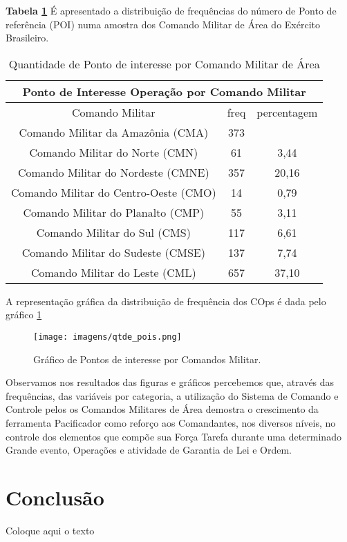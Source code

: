 \hspace{1.5cm}
\textbf{Tabela \ref{QuantidadePois}} É apresentado a distribuição de frequências do número de Ponto de referência (POI) numa amostra dos Comando Militar de Área do Exército Brasileiro. 
\begin{table}[H]
\centering
\begin{tabular}{|c | c| c|} 
 \multicolumn{3}{c}{Ponto de Interesse Operação por Comando Militar}\\ \hline
  Comando Militar & freq  & percentagem  \\ [0.5ex] 
 \hline
 Comando Militar da Amazônia (CMA) &  373 & \\ 
 \hline
 Comando Militar do Norte (CMN) &  61 & 3,44\\
 \hline
 Comando Militar do Nordeste (CMNE) &  357 & 20,16\\
 \hline
 Comando Militar do Centro-Oeste (CMO) &  14 & 0,79\\
 \hline
 Comando Militar do Planalto (CMP) &  55 & 3,11\\
 \hline
 Comando Militar do Sul (CMS) &  117 & 6,61\\
 \hline
 Comando Militar do Sudeste (CMSE) &  137 & 7,74\\
 \hline
 Comando Militar do Leste (CML) &  657 & 37,10\\ [1ex] 
 \hline
\end{tabular}
\caption{Quantidade de Ponto de interesse por Comando Militar de Área}
\label{QuantidadePois}
\end{table}

\hspace{1.5cm}
A representação gráfica da distribuição de frequência dos COps é dada pelo gráfico \ref{figuraPois}
\begin{figure}[H]
        \centering
        \texttt{[image: imagens/qtde\_pois.png]}
        \caption{Gráfico de Pontos de interesse por Comandos Militar.}
        \label{figuraPois}
\end{figure}

\hspace{1.5cm}
Observamos nos resultados das figuras e gráficos percebemos que, através das frequências, das variáveis por categoria, a utilização do Sistema de Comando e Controle pelos os Comandos Militares de Área demostra o crescimento da ferramenta Pacificador como reforço aos Comandantes, nos diversos níveis, no controle dos elementos que compõe sua Força Tarefa durante uma determinado Grande evento, Operações e atividade de Garantia de Lei e Ordem.      

\section*{Conclusão}
\hspace{1.5cm}
Coloque aqui o texto\\